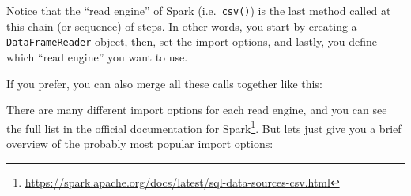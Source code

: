 \documentclass[
  11pt,
  letterpaper,
  DIV=11,
  numbers=noendperiod]{scrreprt}
\newenvironment{Shaded}{\begin{snugshade}}{\end{snugshade}}
\newcommand{\CommentTok}[1]{\textcolor[rgb]{0.37,0.37,0.37}{#1}}
\newcommand{\NormalTok}[1]{\textcolor[rgb]{0.00,0.23,0.31}{#1}}
\newcommand{\OperatorTok}[1]{\textcolor[rgb]{0.37,0.37,0.37}{#1}}
\newcommand{\StringTok}[1]{\textcolor[rgb]{0.13,0.47,0.30}{#1}}
\begin{document}
Notice that the ``read engine'' of Spark (i.e.~\texttt{csv()}) is the
last method called at this chain (or sequence) of steps. In other words,
you start by creating a \texttt{DataFrameReader} object, then, set the
import options, and lastly, you define which ``read engine'' you want to
use.

\begin{Shaded}
\end{Shaded}

If you prefer, you can also merge all these calls together like this:

\begin{Shaded}
\end{Shaded}

There are many different import options for each read engine, and you
can see the full list in the official documentation for
Spark\footnote{\url{https://spark.apache.org/docs/latest/sql-data-sources-csv.html}}.
But lets just give you a brief overview of the probably most popular
import options:
\end{document}
